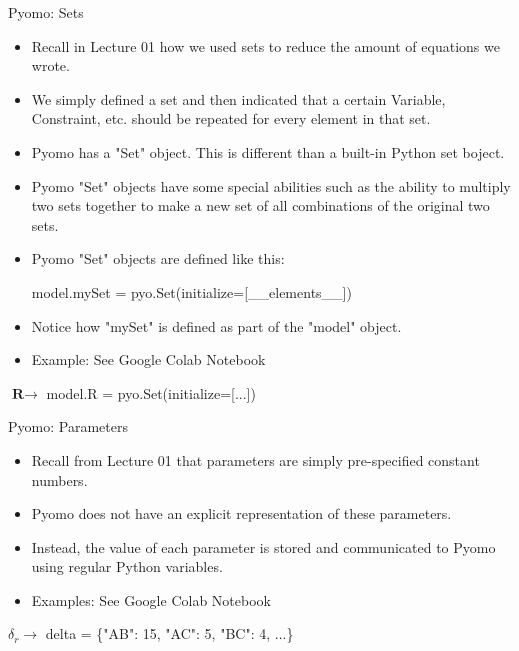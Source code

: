 \documentclass[10pt, aspectratio=169]{beamer}
\begin{document}
\begin{frame}{Pyomo: Sets}
    \begin{itemize}
        \item Recall in Lecture 01 how we used sets to reduce the amount of equations we wrote.
        \item We simply defined a set and then indicated that a certain Variable, Constraint, etc. should be repeated for every element in that set.
        \item Pyomo has a "Set" object. This is different than a built-in Python set boject.
        \item Pyomo "Set" objects have some special abilities such as the ability to multiply two sets together to make a new set of all combinations of the original two sets.
        \item Pyomo "Set" objects are defined like this:
        
        \hspace{0.25cm} model.mySet = pyo.Set(initialize=[\_\_elements\_\_])

        \item Notice how "mySet" is defined as part of the "model" object.
        \item Example: See Google Colab Notebook
    \end{itemize}

    \begin{center}
        $\textbf{R} \rightarrow $ model.R = pyo.Set(initialize=[...])
    \end{center}
\end{frame}

\begin{frame}{Pyomo: Parameters}
    \begin{itemize}
        \item Recall from Lecture 01 that parameters are simply pre-specified constant numbers.
        \item Pyomo does not have an explicit representation of these parameters.
        \item Instead, the value of each parameter is stored and communicated to Pyomo using regular Python variables.
        \item Examples: See Google Colab Notebook
    \end{itemize}
    \begin{center}
        $\delta_r \rightarrow $ delta = \{"AB": 15, "AC": 5, "BC": 4, ...\}
    \end{center}
\end{frame}
\end{document}
